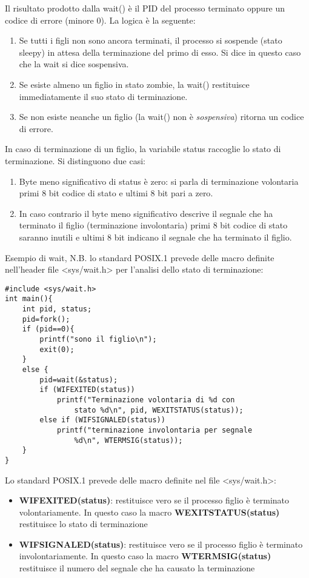 \documentclass{article}
\begin{document}
Il risultato prodotto dalla wait() è il PID del processo terminato oppure 
un codice di errore (minore 0).
La logica è la seguente:
\begin{enumerate}
    \item Se tutti i figli non sono ancora terminati,
    il processo si sospende (stato sleepy) in attesa della terminazione 
    del primo di esso. Si dice in questo caso che la wait si dice sospensiva.
    \item Se esiste almeno un figlio in stato zombie, la wait() restituisce 
    immediatamente il suo stato di terminazione.
    \item Se non esiste neanche un figlio (la wait() non è \textit{sospensiva})
    ritorna un codice di errore.
\end{enumerate}

\noindent In caso di terminazione di un figlio, la variabile status raccoglie lo 
stato di terminazione. Si distinguono due casi:
\begin{enumerate}
    \item Byte meno significativo di status è zero: si parla di terminazione volontaria
    {primi 8 bit codice di stato e ultimi 8 bit pari a zero}. 
    \item In caso contrario il byte meno significativo descrive il segnale
    che ha terminato il figlio (terminazione involontaria) 
    {primi 8 bit codice di stato saranno inutili e ultimi 8 bit 
    indicano il segnale che ha terminato il figlio}.
\end{enumerate}

\noindent Esempio di wait, N.B. lo standard POSIX.1 prevede delle macro definite
nell'header file <sys/wait.h> per l'analisi dello
stato di terminazione:

\begin{lstlisting}[style=CStyle]
#include <sys/wait.h>
int main(){
    int pid, status;
    pid=fork();
    if (pid==0){
        printf("sono il figlio\n");
        exit(0);
    }
    else { 
        pid=wait(&status);
        if (WIFEXITED(status))
            printf("Terminazione volontaria di %d con
                stato %d\n", pid, WEXITSTATUS(status));
        else if (WIFSIGNALED(status))
            printf("terminazione involontaria per segnale
                %d\n", WTERMSIG(status)); 
    }
}
\end{lstlisting}

\noindent Lo standard POSIX.1 prevede delle macro definite nel 
file <sys/wait.h>: \begin{itemize}
    \item \textbf{WIFEXITED(status)}: restituisce vero se il 
     processo figlio è terminato volontariamente. In questo
     caso la macro \textbf{WEXITSTATUS(status)} restituisce 
     lo stato di terminazione
    \item \textbf{WIFSIGNALED(status)}: restituisce vero se il processo
    figlio è terminato involontariamente. In questo caso la
    macro \textbf{WTERMSIG(status)} restituisce il numero del
    segnale che ha causato la terminazione
    \end{itemize}
\end{document}
